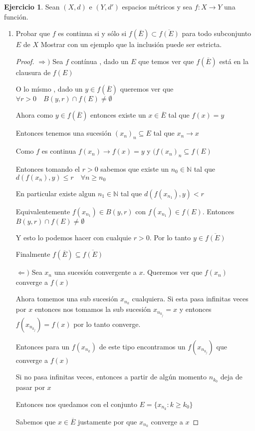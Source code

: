 \documentclass[11pt]{report}
\newcommand{\N}{\mathbb{N}}
\newcommand{\Ra}{\Rightarrow}
\newcommand{\ra}{\rightarrow}
\newcommand{\ol}{\overline}
\theoremstyle{definition}
\newtheorem{ej}{Ejercicio}
\begin{document}
	
	\begin{ej}
		Sean $(X,d)$ e $(Y,d')$ espacios métricos y sea $f: X \ra Y$ una función.
		\begin{enumerate}
			\item Probar que $f$ es continua si y sólo si $f(\ol E) \subset \ol{f(E)}$ para todo subconjunto $E$ de $X$
				Mostrar con un ejemplo que la inclusión puede ser estricta.
				\begin{proof}
					$\Ra )$ Sea $f$ contínua , dado un $E$ que temos ver que $f(\ol E)$ está en la clausura de $f(E)$

					O lo mísmo , dado un $y \in f(\ol E)$ queremos ver que $\forall r >0 \quad B(y,r) \cap f(E) \neq \emptyset$

					Ahora como $y \in f(\ol E)$ entonces existe un $x \in \ol E$ tal que $f(x) = y$

					Entonces tenemos una sucesión $(x_n)_n \subseteq E$ tal que $x_n \ra x$

					Como $f$ es continua $f(x_n) \ra f(x) = y$ y $(f(x_n)_n \subseteq f(E)$

					Entonces tomando el $r>0$ sabemos que existe un $n_0 \in \N$ tal que $d(f(x_n),y) \leq r \quad \forall n \geq n_0$ 

					En particular existe algun $n_1 \in \N$ tal que $d(f(x_{n_1}),y) < r$ 

					Equivalentemente $f(x_{n_1}) \in B(y,r)$ con $f(x_{n_1}) \in f(E)$. Entonces $B(y,r) \cap f(E) \neq \emptyset$ 

					Y esto lo podemos hacer con cualquie $r>0$. Por lo tanto $y \in \ol{f(E)}$

					Finalmente $f(\ol E) \subseteq \ol{f(E)}$

					$\Leftarrow )$ Sea $x_n$ una sucesión convergente a $x$. Queremos ver que $f(x_n)$ converge a $f(x)$ 

					Ahora tomemos una sub sucesión $x_{n_k}$ cualquiera. Si esta pasa infinitas veces por $x$ entonces nos tomamos la sub sucesión $x_{n_{k_j}} = x$  y entonces $f(x_{n_{k_j}}) = f(x)$ por lo tanto converge.

					Entonces para un $f(x_{n_k})$ de este tipo encontramos un $f(x_{n_{k_j}})$ que converge a $f(x)$

					Si no pasa infinitas veces, entonces a partir de algún momento $n_{k_0}$ deja de pasar por $x$

					Entonces nos quedamos con el conjunto $E = \{ x_{n_{k}}: k \geq k_0 \}$
					
					Sabemos que $x \in \ol E$ justamente por que $x_{n_k}$ converge a $x$


\end{proof}
\end{enumerate}
\end{ej}
\end{document}
